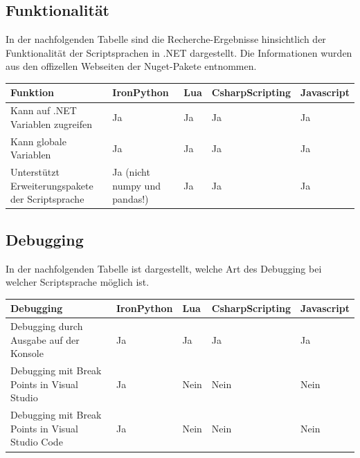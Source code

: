 \subsection{Funktionalität}
In der nachfolgenden Tabelle sind die Recherche-Ergebnisse hinsichtlich der Funktionalität der Scriptsprachen in .NET dargestellt.
Die Informationen wurden aus den offizellen Webseiten der Nuget-Pakete entnommen.

\begin{table}[H]
    \begin{tabular}{|p{3cm}|p{3cm}|p{3cm}|p{3cm}|p{3cm}|}
        \hline
        Funktion & IronPython & Lua & CsharpScripting & Javascript\\ \hline
        Kann auf .NET Variablen zugreifen & Ja & Ja & Ja & Ja \\ \hline
        Kann globale Variablen & Ja & Ja & Ja & Ja \\ \hline
        Unterstützt Erweiterungspakete der Scriptsprache & Ja (nicht numpy und pandas!) & Ja & Ja & Ja \\ \hline 
    \end{tabular} 
\end{table}
\newpage
\subsection{Debugging}
In der nachfolgenden Tabelle ist dargestellt, welche Art des Debugging bei welcher Scriptsprache möglich ist.

\begin{table}[H]
    \begin{tabular}{|p{2.5cm}|p{2.5cm}|p{2.5cm}|p{2.5cm}|p{2.5cm}|}
        \hline
        Debugging & IronPython & Lua & CsharpScripting & Javascript\\ \hline
        Debugging durch Ausgabe auf der Konsole & Ja & Ja & Ja & Ja \\ \hline
        Debugging mit Break Points in Visual Studio & Ja & Nein & Nein & Nein\\ \hline
        Debugging mit Break Points in Visual Studio Code & Ja & Nein & Nein & Nein \\ \hline
    \end{tabular}
\end{table}